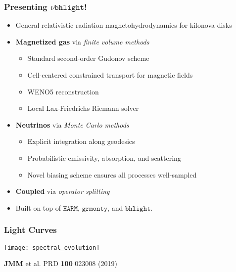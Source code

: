\documentclass[]{beamer}
\begin{document}
\begin{frame}
  \frametitle{Presenting $\nu\texttt{bhlight}$!}
  \begin{itemize}
  \item General relativistic radiation magnetohydrodynamics for kilonova disks
  \item \textbf{Magnetized gas} via \textit{finite volume methods}
    \begin{itemize}
    \item Standard second-order Gudonov scheme
    \item Cell-centered constrained transport for magnetic fields
    \item WENO5 reconstruction
    \item Local Lax-Friedrichs Riemann solver
    \end{itemize}
  \item \textbf{Neutrinos} via \textit{Monte Carlo methods}
    \begin{itemize}
    \item Explicit integration along geodesics
    \item Probabilistic emissivity, absorption, and scattering
    \item Novel biasing scheme ensures all processes well-sampled
    \end{itemize}
  \item \textbf{Coupled} via \textit{operator splitting}
  \item Built on top of $\texttt{HARM}$, $\texttt{grmonty}$, and
    $\texttt{bhlight}$.
  \end{itemize}
\end{frame}

\begin{frame}
  \frametitle{Light Curves}
  \begin{center}
    \texttt{[image: spectral\_evolution]}
  \end{center}
  \begin{tiny}
    \textbf{JMM} et al. PRD \textbf{100} 023008 (2019)
  \end{tiny}
\end{frame}
\end{document}
